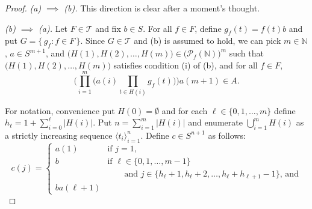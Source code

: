 \documentclass[12pt]{article}
\theoremstyle{plain}
\theoremstyle{definition}
\newcommand{\la}{\langle}
\newcommand{\ra}{\rangle}
\newcommand{\bbN}{\mathbb{N}}
\newcommand{\calT}{\mathcal{T}}
\newcommand{\Pf}{\mathcal{P}_f}
\begin{document}
\begin{proof}
  \textsl{(a) $\implies$ (b).} 
  This direction is clear after a moment's thought. 

  \textsl{(b) $\implies$ (a).}
  Let $F \in \calT$ and fix $b \in S$. 
  For all $f \in F$, define $g_f(t) = f(t)b$ and put $G = \{\, g_f : f
  \in F \,\}$.
  Since $G \in \calT$ and (b) is assumed to hold, we can pick $m \in
  \bbN$, $a \in S^{m+1}$, and $\bigl( H(1), H(2), \ldots, H(m) \bigr)
  \in \bigl( \Pf(\bbN) \bigr)^m$ such that $\bigl( H(1), H(2), \ldots,
  H(m) \bigr)$ satisfies condition (i) of (b), and for all $f \in F$,
  \[
    \biggl( \prod_{i=1}^m \bigl( a(i) \prod_{t \in H(i)} g_f(t) \bigr)
    \biggr) a(m+1) \in A.
  \]

  For notation, convenience put $H(0) = \emptyset$ and for each $\ell \in
  \{0, 1, \ldots, m\}$ define $h_\ell = 1 + \sum_{i=0}^\ell |H(i)|$. 
  Put $n = \sum_{i=1}^m |H(i)|$ and enumerate $\bigcup_{i=1}^m H(i)$
  as a strictly increasing sequence $\la t_i \ra_{i=1}^n$. 
  Define $c \in S^{n+1}$ as follows:
  \[
    c(j) = 
    \begin{cases}
      a(1) & \mbox{if $j = 1$,}\\
      b    & \mbox{if $\ell \in \{0, 1, \ldots, m-1\}$ } \\
      & \hspace{2em}\mbox{and $j \in \{h_\ell +1, h_\ell + 2, \ldots,
        h_\ell + h_{\ell +1} - 1 \}$, and}\\
      b a(\ell + 1) &
    \end{cases}
  \]
\end{proof}
\end{document}

